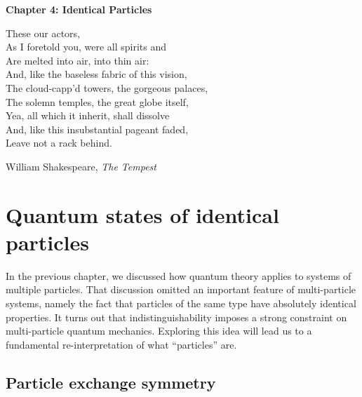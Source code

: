 \documentclass[prx,12pt]{revtex4-2}
\begin{document}
\setcounter{page}{60}

\begin{center}
{\Large \textbf{Chapter 4: Identical Particles}}
\end{center}

\epigraph{These our actors,\\As I foretold you, were all spirits
  and\\Are melted into air, into thin air: \\And, like the baseless
  fabric of this vision,\\ The cloud-capp'd towers, the gorgeous
  palaces,\\ The solemn temples, the great globe itself,\\ Yea, all
  which it inherit, shall dissolve\\And, like this insubstantial
  pageant faded, \\ Leave not a rack behind.}{William Shakespeare,
  \textit{The Tempest}}

\section{Quantum states of identical particles}

In the previous chapter, we discussed how quantum theory applies to
systems of multiple particles.  That discussion omitted an important
feature of multi-particle systems, namely the fact that particles of
the same type have absolutely identical properties.  It turns out that
indistinguishability imposes a strong constraint on multi-particle
quantum mechanics.  Exploring this idea will lead us to a fundamental
re-interpretation of what ``particles'' are.

\subsection{Particle exchange symmetry}
\label{sec:exchange}
\end{document}
